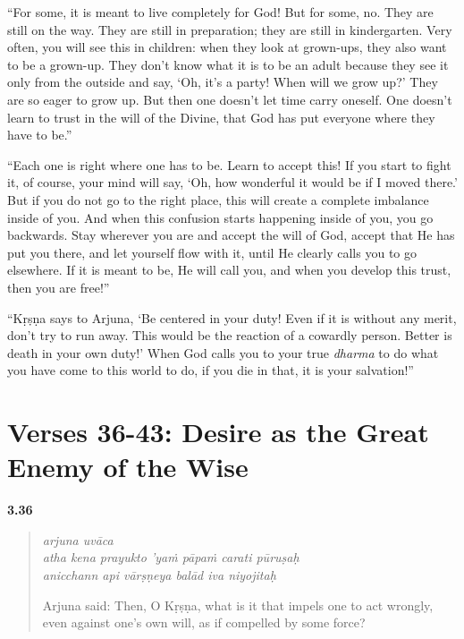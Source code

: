 \enquote{For some, it is meant to live completely for God! But for some, no. They are still on the way. They are still in preparation; they are still in kindergarten. Very often, you will see this in children: when they look at grown-ups, they also want to be a grown-up. They don’t know what it is to be an adult because they see it only from the outside and say, \enquote{Oh, it’s a party! When will we grow up?} They are so eager to grow up. But then one doesn’t let time carry oneself. One doesn’t learn to trust in the will of the Divine, that God has put everyone where they have to be.}

\enquote{Each one is right where one has to be. Learn to accept this! If you start to fight it, of course, your mind will say, \enquote{Oh, how wonderful it would be if I moved there.} But if you do not go to the right place, this will create a complete imbalance inside of you. And when this confusion starts happening inside of you, you go backwards. Stay wherever you are and accept the will of God, accept that He has put you there, and let yourself flow with it, until He clearly calls you to go elsewhere. If it is meant to be, He will call you, and when you develop this trust, then you are free!}

\enquote{Kṛṣṇa says to Arjuna, \enquote{Be centered in your duty! Even if it is without any merit, don’t try to run away. This would be the reaction of a cowardly person. Better is death in your own duty!} When God calls you to your true \textit{dharma} to do what you have come to this world to do, if you die in that, it is your salvation!}

\section{Verses 36-43: Desire as the Great Enemy of the Wise}\label{sec-verses-36-43-desire-as-the-great-enemy-of-the-wise}

\par\noindent\textbf{3.36}\par
\begin{verse}
\textit{arjuna uvāca} \\
\textit{atha kena prayukto ’yaṁ pāpaṁ carati pūruṣaḥ} \\
\textit{anicchann api vārṣṇeya balād iva niyojitaḥ}

\noindent Arjuna said: Then, O Kṛṣṇa, what is it that impels one to act wrongly, even against one’s own will, as if compelled by some force?
\end{verse}
\par


